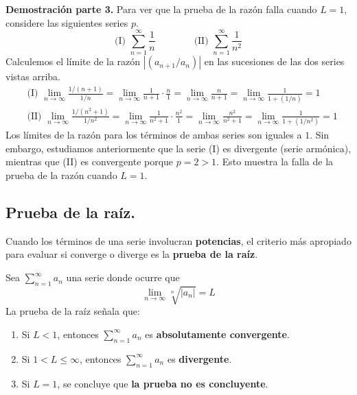 \documentclass[12pt]{article}
\begin{document}
\textbf{Demostración parte 3.} Para ver que la prueba de la razón falla cuando $L = 1$, considere las siguientes series $p$.
\[
  \text{(I) } \sum_{n = 1}^{\infty} \frac{1}{n}
  \qquad \qquad
  \text{(II) } \sum_{n = 1}^{\infty} \frac{1}{n^{2}}
\]
Calculemos el límite de la razón $|(a_{n + 1}/a_{n})|$ en las sucesiones de las dos series vistas arriba.
\begin{align*}
  &\text{(I) } \lim_{n \to \infty} \frac{1/(n + 1)}{1/n} = \lim_{n \to \infty} \frac{1}{n + 1} \cdot \frac{n}{1}
                                                         = \lim_{n \to \infty} \frac{n}{n + 1}
                                                         = \lim_{n \to \infty} \frac{1}{1 + (1/n)}
                                                         = 1 \\
  &\text{(II) } \lim_{n \to \infty} \frac{1/(n^{2} + 1)}{1/n^{2}} = \lim_{n \to \infty} \frac{1}{n^{2} + 1} \cdot \frac{n^{2}}{1}
                                                                  = \lim_{n \to \infty} \frac{n^{2}}{n^{2} + 1}
                                                                  = \lim_{n \to \infty} \frac{1}{1 + (1/n^{2})}
                                                                  = 1
\end{align*}
Los límites de la razón para los términos de ambas series son iguales a $1$. Sin embargo, estudiamos anteriormente que la serie (I) es divergente (serie armónica), mientras que (II) es convergente porque $p = 2 > 1$. Esto muestra la falla de la prueba de la razón cuando $L = 1$.

\subsection{Prueba de la raíz.}

Cuando los términos de una serie involucran \textbf{potencias}, el criterio más apropiado para evaluar si converge o diverge es la \textbf{prueba de la raíz}.

Sea $\sum_{n = 1}^{\infty} a_{n}$ una serie donde ocurre que
\[
  \lim_{n \to \infty} \sqrt[n]{|a_{n}|} = L
\]
La prueba de la raíz señala que:

\begin{enumerate}
\item Si $L < 1$, entonces $\sum_{n = 1}^{\infty} a_{n}$ es \textbf{absolutamente convergente}.
\item Si $1 < L \leq \infty$, entonces $\sum_{n = 1}^{\infty} a_{n}$ es \textbf{divergente}.
\item Si $L = 1$, se concluye que \textbf{la prueba no es concluyente}.
\end{enumerate}
\end{document}
